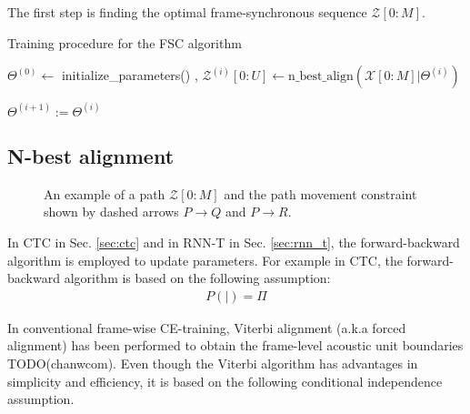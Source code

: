 \documentclass{article}
\begin{document}
The first step is finding the optimal frame-synchronous sequence
$\mathcal{Z}[0:M]$.   


\begin{algorithm}
  \caption{Training procedure for the FSC algorithm}
  \label{algo:fsc_training}
  \begin{algorithmic}
    \State $\Theta^{(0)} \leftarrow$ initialize\_parameters()
      , 
        \State $ {{\mathcal{Z}^{(i)}}[0:U]}
          \leftarrow
          \text{n\_best\_align}
          \left(
            \mathcal{X}[0:M] \Big| \Theta^{(i)}
          \right)$


    \EndFor
    \State $\Theta^{(i+1)} := \Theta^{(i)}$
  \EndFor
  \label{algorithm:fsc_training}
  \end{algorithmic}
\end{algorithm}



\subsection{N-best alignment}
\label{sec:n_best_alignment}


\begin{figure}
  \centering
    \resizebox{100mm}{!}{
      
    } 
    \caption {
      An example of a path $\mathcal{Z}[0:M]$ and the path movement 
      constraint shown by dashed arrows $P \rightarrow Q$ and $P \rightarrow R$. 
      \label{fig:path_alignment}
    }
  \label{fig:path_alignment}
\end{figure}

In CTC in Sec. \ref{sec:ctc} and in RNN-T in Sec. \ref{sec:rnn_t}, the 
forward-backward algorithm is employed to update parameters. 
For example in CTC, the forward-backward algorithm is based on the
following assumption:
\begin{align}
  P \left(  \Big| \right) = \Pi
\end{align}

In conventional frame-wise CE-training, Viterbi alignment 
(a.k.a forced alignment) has been performed to obtain the frame-level 
acoustic unit  boundaries TODO(chanwcom). Even though the Viterbi algorithm
has advantages in simplicity and efficiency, it is based on
the following conditional independence assumption.
\end{document}
